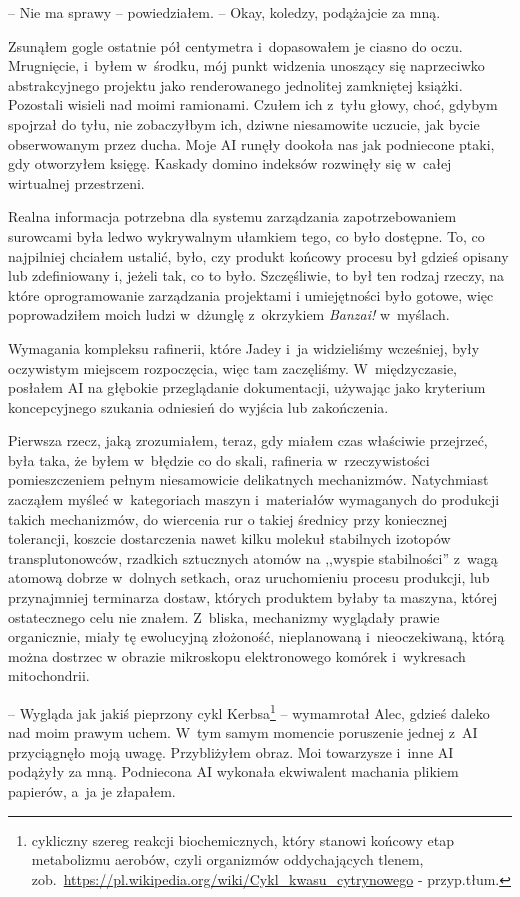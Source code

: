 \documentclass[oneside,polish,12pt,sfheadings]{mwbk}
\begin{document}
-- Nie ma sprawy -- powiedziałem. -- Okay, koledzy, podążajcie za mną.

Zsunąłem gogle ostatnie pół centymetra i~dopasowałem je ciasno do oczu.
Mrugnięcie, i~byłem w~środku, mój punkt widzenia unoszący się
naprzeciwko abstrakcyjnego projektu jako renderowanego jednolitej
zamkniętej książki. Pozostali wisieli nad moimi ramionami. Czułem ich z~tyłu głowy, choć, gdybym spojrzał do tyłu, nie zobaczyłbym ich, dziwne
niesamowite uczucie, jak bycie obserwowanym przez ducha. Moje AI runęły
dookoła nas jak podniecone ptaki, gdy otworzyłem księgę. Kaskady domino
indeksów rozwinęły się w~całej wirtualnej przestrzeni.

Realna informacja potrzebna dla systemu zarządzania zapotrzebowaniem
surowcami była ledwo wykrywalnym ułamkiem tego, co było dostępne. To, co
najpilniej chciałem ustalić, było, czy produkt końcowy procesu był
gdzieś opisany lub zdefiniowany i, jeżeli tak, co to było. Szczęśliwie,
to był ten rodzaj rzeczy, na które oprogramowanie zarządzania projektami
i umiejętności było gotowe, więc poprowadziłem moich ludzi w~dżunglę z~okrzykiem \emph{Banzai!} w~myślach.

Wymagania kompleksu rafinerii, które Jadey i~ja widzieliśmy wcześniej,
były oczywistym miejscem rozpoczęcia, więc tam zaczęliśmy. W~międzyczasie, posłałem AI na głębokie przeglądanie dokumentacji,
używając jako kryterium koncepcyjnego szukania odniesień do wyjścia lub
zakończenia.

Pierwsza rzecz, jaką zrozumiałem, teraz, gdy miałem czas właściwie
przejrzeć, była taka, że byłem w~błędzie co do skali, rafineria w~rzeczywistości pomieszczeniem pełnym niesamowicie delikatnych
mechanizmów. Natychmiast zacząłem myśleć w~kategoriach maszyn i~materiałów wymaganych do produkcji takich mechanizmów, do wiercenia rur
o takiej średnicy przy koniecznej tolerancji, koszcie dostarczenia nawet
kilku molekuł stabilnych izotopów transplutonowców, rzadkich sztucznych
atomów na ,,wyspie stabilności'' z~wagą atomową dobrze w~dolnych setkach,
oraz uruchomieniu procesu produkcji, lub przynajmniej terminarza dostaw,
których produktem byłaby ta maszyna, której ostatecznego celu nie
znałem. Z~bliska, mechanizmy wyglądały prawie organicznie, miały tę
ewolucyjną złożoność, nieplanowaną i~nieoczekiwaną, którą można dostrzec
w obrazie mikroskopu elektronowego komórek i~wykresach mitochondrii.

-- Wygląda jak jakiś pieprzony cykl
Kerbsa\footnote{cykliczny szereg reakcji biochemicznych,
który stanowi końcowy etap metabolizmu aerobów, czyli organizmów
oddychających tlenem, zob.~\url{https://pl.wikipedia.org/wiki/Cykl\_kwasu\_cytrynowego} - przyp.tłum.} --
wymamrotał Alec, gdzieś daleko nad moim prawym uchem. W~tym samym
momencie poruszenie jednej z~AI przyciągnęło moją uwagę. Przybliżyłem
obraz. Moi towarzysze i~inne AI podążyły za mną. Podniecona AI wykonała
ekwiwalent machania plikiem papierów, a~ja je złapałem.
\end{document}
